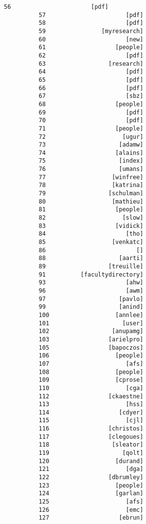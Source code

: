 \documentclass[11pt]{article}
\begin{document}
\begin{Verbatim}[commandchars=\\\{\}]
          56                       [pdf]
          57                       [pdf]
          58                       [pdf]
          59                [myresearch]
          60                       [new]
          61                    [people]
          62                       [pdf]
          63                  [research]
          64                       [pdf]
          65                       [pdf]
          66                       [pdf]
          67                       [sbz]
          68                    [people]
          69                       [pdf]
          70                       [pdf]
          71                    [people]
          72                      [ugur]
          73                     [adamw]
          74                    [alains]
          75                     [index]
          76                     [umans]
          77                   [winfree]
          78                   [katrina]
          79                  [schulman]
          80                   [mathieu]
          81                    [people]
          82                      [slow]
          83                    [vidick]
          84                       [tho]
          85                   [venkatc]
          86                          []
          88                     [aarti]
          89                  [treuille]
          91          [facultydirectory]
          93                       [ahw]
          96                       [awm]
          97                     [pavlo]
          99                     [anind]
          100                   [annlee]
          101                     [user]
          102                  [anupamg]
          103                 [arielpro]
          105                 [bapoczos]
          106                   [people]
          107                      [afs]
          108                   [people]
          109                   [cprose]
          110                      [cga]
          112                 [ckaestne]
          113                      [hss]
          114                    [cdyer]
          115                      [cjl]
          116                 [christos]
          117                 [clegoues]
          118                  [sleator]
          119                     [qolt]
          120                   [durand]
          121                      [dga]
          122                 [dbrumley]
          123                   [people]
          124                   [garlan]
          125                      [afs]
          126                      [emc]
          127                    [ebrun]

\end{Verbatim}
\end{document}
